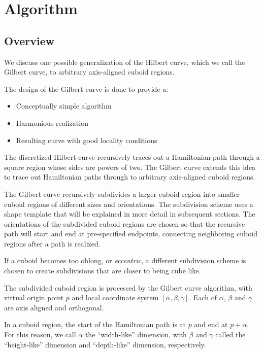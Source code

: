 \section{Algorithm}

\subsection{Overview}

We discuss one possible generalization of the Hilbert curve, which we call the Gilbert curve,
to arbitrary axis-aligned cuboid regions.

The design of the Gilbert curve is done to provide a:

\begin{itemize}
  \item Conceptually simple algorithm
  \item Harmonious realization
  \item Resulting curve with good locality conditions
\end{itemize}

The discretized Hilbert curve recursively traces out a Hamiltonian path through a square
region whose sides are powers of two.
The Gilbert curve extends this idea to trace out Hamiltonian paths through to arbitrary axis-aligned
cuboid regions.

The Gilbert curve recursively subdivides a larger cuboid region into smaller cuboid
regions of different sizes and orientations.
The subdivision scheme uses a shape template that will be explained in more detail in subsequent sections.
The orientations of the subdivided cuboid regions are chosen so that the recursive path
will start and end at pre-specified endpoints, connecting neighboring cuboid regions
after a path is realized.

If a cuboid becomes too oblong, or \textit{eccentric}, a different subdivision scheme is chosen
to create subdivisions that are closer to being cube like.


The subdivided cuboid region is processed by the Gilbert curve algorithm,
with virtual origin point $p$ and local coordinate system $[ \alpha, \beta, \gamma ]$.
Each of $\alpha$, $\beta$ and $\gamma$ are axis aligned and orthogonal.

In a cuboid region, the start of the Hamiltonian path is at $p$ and end at $p + \alpha$.
For this reason, we call $\alpha$ the ``width-like'' dimension, with $\beta$ and $\gamma$
called the ``height-like'' dimension and ``depth-like'' dimension, respectively.

